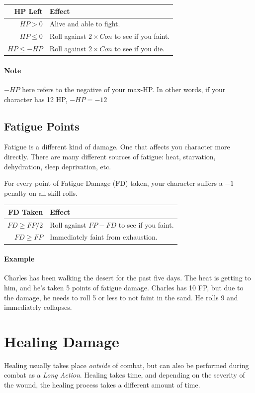 \begin{center}
  \begin{tabular}{r | l}
    \textbf{HP Left} & \textbf{Effect} \\\hline
    $HP > 0$         & Alive and able to fight. \\
    $HP \leq 0$      & Roll against $2 \times Con$ to see if you faint. \\
    $HP \leq -HP$    & Roll against $2 \times Con$ to see if you die.
  \end{tabular}
\end{center}

\paragraph{Note} $-HP$ here refers to the negative of your max-HP.
In other words, if your character has 12 HP, $-HP = -12$
  
\subsection{Fatigue Points}
Fatigue is a different kind of damage.
One that affects you character more directly.
There are many different sources of fatigue: heat, starvation, dehydration, sleep deprivation, etc.

For every point of Fatigue Damage (FD) taken, your character suffers a $-1$ penalty on all skill rolls.

\begin{center}
  \begin{tabular}{r | l}
    \textbf{FD Taken} & \textbf{Effect} \\\hline
    $FD \geq FP/2$    & Roll against $FP - FD$ to see if you faint. \\
    $FD \geq FP$      & Immediately faint from exhaustion.
  \end{tabular}
\end{center}

\paragraph{Example} Charles has been walking the desert for the past five days.
The heat is getting to him, and he's taken 5 points of fatigue damage.
Charles has 10 FP, but due to the damage, he needs to roll 5 or less to not faint in the sand.
He rolls 9 and immediately collapses.

\section{Healing Damage}
Healing usually takes place \textit{outside} of combat, but can also be performed during combat as a \textit{Long Action}.
Healing takes time, and depending on the severity of the wound, the healing process takes a different amount of time.

